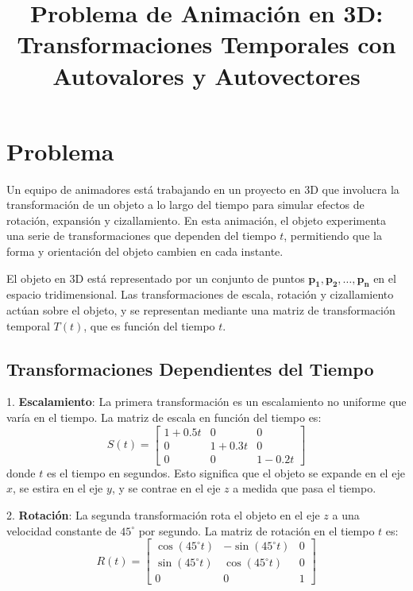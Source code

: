 \documentclass{article}
\begin{document}
\title{Problema de Animación en 3D: Transformaciones Temporales con Autovalores y Autovectores}
\author{}
\date{}
\maketitle

\section*{Problema}

Un equipo de animadores está trabajando en un proyecto en 3D que involucra la transformación de un objeto a lo largo del tiempo para simular efectos de rotación, expansión y cizallamiento. En esta animación, el objeto experimenta una serie de transformaciones que dependen del tiempo \( t \), permitiendo que la forma y orientación del objeto cambien en cada instante.

El objeto en 3D está representado por un conjunto de puntos \(\mathbf{p_1}, \mathbf{p_2}, \dots, \mathbf{p_n}\) en el espacio tridimensional. Las transformaciones de escala, rotación y cizallamiento actúan sobre el objeto, y se representan mediante una matriz de transformación temporal \( T(t) \), que es función del tiempo \( t \).

\subsection*{Transformaciones Dependientes del Tiempo}

1. \textbf{Escalamiento}: La primera transformación es un escalamiento no uniforme que varía en el tiempo. La matriz de escala en función del tiempo es:
   \[
   S(t) = \begin{bmatrix} 1 + 0.5t & 0 & 0 \\ 0 & 1 + 0.3t & 0 \\ 0 & 0 & 1 - 0.2t \end{bmatrix}
   \]
   donde \( t \) es el tiempo en segundos. Esto significa que el objeto se expande en el eje \( x \), se estira en el eje \( y \), y se contrae en el eje \( z \) a medida que pasa el tiempo.

2. \textbf{Rotación}: La segunda transformación rota el objeto en el eje \( z \) a una velocidad constante de \( 45^\circ \) por segundo. La matriz de rotación en el tiempo \( t \) es:
   \[
   R(t) = \begin{bmatrix} \cos(45^\circ t) & -\sin(45^\circ t) & 0 \\ \sin(45^\circ t) & \cos(45^\circ t) & 0 \\ 0 & 0 & 1 \end{bmatrix}
   \]
\end{document}

